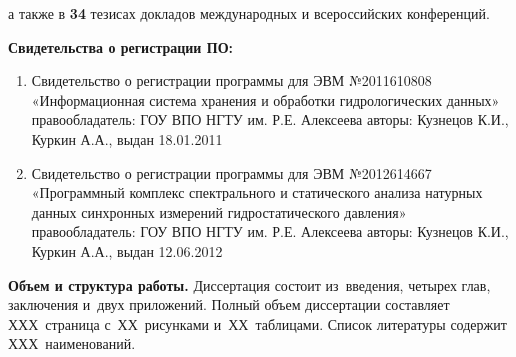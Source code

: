 а также в \textbf{34} тезисах докладов международных и всероссийских конференций.

\textbf{Свидетельства о регистрации ПО:}
\begin{enumerate}
  \item Свидетельство о регистрации программы для ЭВМ №2011610808 «Информационная система хранения и обработки гидрологических данных» правообладатель: ГОУ ВПО НГТУ им. Р.Е. Алексеева авторы: Кузнецов К.И., Куркин А.А., выдан 18.01.2011
  \item Свидетельство о регистрации программы для ЭВМ №2012614667 «Программный комплекс спектрального и статического анализа натурных данных синхронных измерений гидростатического давления»  правообладатель: ГОУ ВПО НГТУ им. Р.Е. Алексеева авторы: Кузнецов К.И., Куркин А.А., выдан \textcolor[rgb]{1.00,0.00,0.00}{12.06.2012}
\end{enumerate}

\textbf{Объем и структура работы.} Диссертация состоит из~введения, четырех глав, заключения и~двух приложений. Полный объем диссертации составляет ХХХ~страница с~ХХ~рисунками и~ХХ~таблицами. Список литературы содержит ХХХ~наименований.

\clearpage
